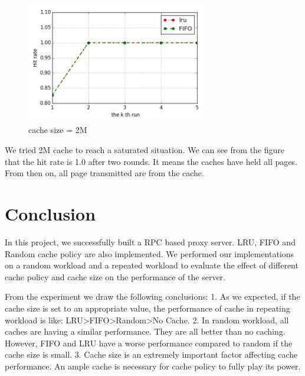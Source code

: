 \documentclass[paper=a4, fontsize=11pt]{scrartcl} %
\numberwithin{equation}{section} %
\numberwithin{figure}{section} %
\numberwithin{table}{section} %
\begin{document}
\begin{figure}[h]
  \centering
  \includegraphics[width=0.7\textwidth]{../data/hit2M}
  \caption{cache size = 2M}
  \label{fig:time2M}
\end{figure}
We tried 2M cache to reach a saturated situation. We can see from the figure that the hit rate is 1.0 after two rounds. It means the caches have held all pages. From then on, all page transmitted are from the cache. 
\section{Conclusion}
In this project, we successfully built a RPC based proxy server. LRU, FIFO and Random cache policy are also implemented. We performed our implementations on a random workload and a repeated workload to evaluate the effect of different cache policy and cache size on the performance of the server. 

From the experiment we draw the following conclusions:
1. As we expected, if the cache size is set to an appropriate value, the performance of cache in repeating workload is like: LRU>FIFO>Random>No Cache.
2. In random workload, all caches are having a similar performance. They are all better than no caching. However, FIFO and LRU have a worse performance compared to random if the cache size is small. 
3. Cache size is an extremely important factor affecting cache performance. An ample cache is necessary for cache policy to fully play its power. 
\end{document}
